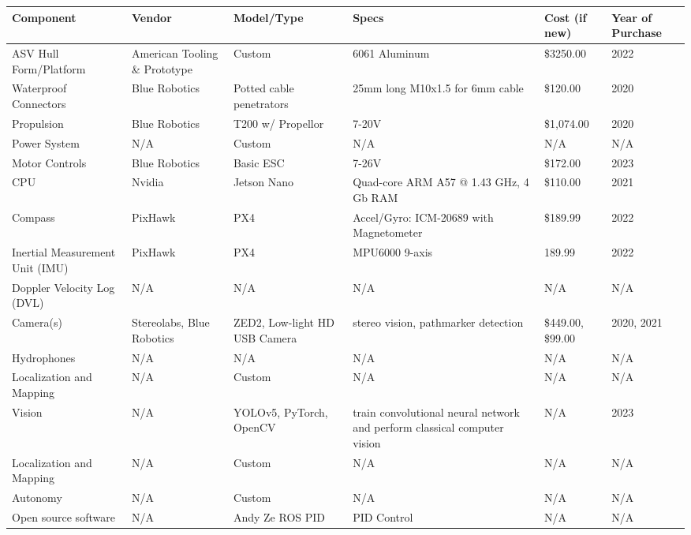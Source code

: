 \documentclass[conference]{IEEEtran}
\begin{document}
\begin{center}
\begin{table}[htbp]
\begin{tabularx}{\textwidth}{|X|X|X|X|X|X|}
    \hline
        Component & Vendor & Model/Type & Specs & Cost (if new) & Year of Purchase \\ \hline
        ASV Hull Form/Platform  & American Tooling \& Prototype & Custom & 6061 Aluminum & \$3250.00 & 2022 \\ \hline
        Waterproof Connectors & Blue Robotics & Potted cable penetrators & 25mm long M10x1.5 for 6mm cable & \$120.00 & 2020 \\ \hline
        Propulsion  & Blue Robotics & T200 w/ Propellor & 7-20V & \$1,074.00  & 2020\\ \hline
        Power System & N/A & Custom & N/A & N/A & N/A \\ \hline
        Motor Controls  & Blue Robotics & Basic ESC & 7-26V & \$172.00  & 2023 \\ \hline
        CPU & Nvidia & Jetson Nano & Quad-core ARM A57 @ 1.43 GHz, 4 Gb RAM & \$110.00  & 2021 \\ \hline
        Compass  & PixHawk & PX4 & Accel/Gyro: ICM-20689 with Magnetometer & \$189.99  & 2022 \\ \hline
        Inertial Measurement Unit (IMU)  & PixHawk & PX4 & MPU6000 9-axis & 189.99 & 2022 \\ \hline
        Doppler Velocity Log (DVL) & N/A & N/A & N/A & N/A & N/A \\ \hline
        Camera(s) & Stereolabs, Blue Robotics & ZED2, Low-light HD USB Camera & stereo vision, pathmarker detection & \$449.00, \$99.00  & 2020, 2021 \\ \hline
        Hydrophones & N/A & N/A & N/A & N/A & N/A \\ \hline
        Localization and Mapping  & N/A & Custom & N/A & N/A & N/A \\ \hline
        Vision  & N/A & YOLOv5, PyTorch, OpenCV & train convolutional neural network and perform classical computer vision & N/A & 2023 \\ \hline
        Localization and Mapping  & N/A & Custom & N/A & N/A & N/A \\ \hline
        Autonomy  & N/A & Custom & N/A & N/A & N/A \\ \hline
        Open source software & N/A & Andy Ze ROS PID & PID Control & N/A & N/A \\ \hline
    \end{tabularx}
\label{tab1e}
\end{table}
\end{center}
\end{document}

